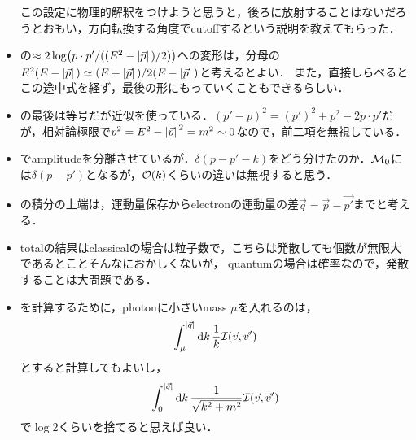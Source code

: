 \begin{itemize}
	この設定に物理的解釈をつけようと思うと，後ろに放射することはないだろうとおもい，方向転換する角度でcutoffするという説明を教えてもらった．


	\item {}の$\approx 2\log(p\cdot p'/((E^2-\abs*{\vec{p}})/2))$への変形は，分母の$E^2(E-\abs*{\vec{p}}) \simeq (E+\abs*{\vec{p}})/2(E-\abs*{\vec{p}})$と考えるとよい．
	また，直接しらべるとこの途中式を経ず，最後の形にもっていくこともできるらしい． 
	\item {}の最後は等号だが近似を使っている．$(p'-p)^2 = (p')^2 + p^2 - 2p\cdot p'$だが，相対論極限で$p^2 = E^2 - \abs*{\vec{p}}^2 = m^2\sim0$なので，前二項を無視している．
	\item {}でamplitudeを分離させているが．$\delta(p-p'-k)$をどう分けたのか．$\mathcal{M}_0$には$\delta(p-p')$となるが，$\mathcal{O}(k)$くらいの違いは無視すると思う．
	\item {}の積分の上端は，運動量保存からelectronの運動量の差$\vec{q} = \vec{p} - \vec{p'}$までと考える．
	\item totalの結果はclassicalの場合は粒子数で，こちらは発散しても個数が無限大であるとことそんなにおかしくないが，
		quantumの場合は確率なので，発散することは大問題である．
	\item {}を計算するために，photonに小さいmass $\mu$を入れるのは，
		\begin{equation}
			\int_{\mu}^{\abs*{\vec{q}}} \dd{k}\frac{1}{k}\mathcal{I}(\vec{v}, \vec{v}')
		\end{equation}
		とすると計算してもよいし，
		\begin{equation}
			\int_{0}^{\abs*{\vec{q}}} \dd{k}\frac{1}{\sqrt{k^2+m^2}}\mathcal{I}(\vec{v}, \vec{v}')
		\end{equation}
		で$\log 2$くらいを捨てると思えば良い．
\end{itemize}

